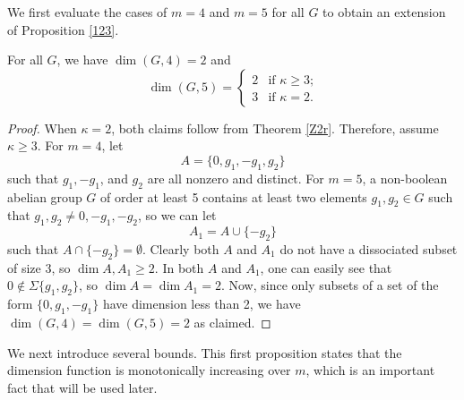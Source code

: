 \documentclass[ml]{sdoc}
\begin{document}
We first evaluate the cases of $m=4$ and $m=5$ for all $G$ to obtain an extension of Proposition \ref{123}.

\begin{proposition}\label{45}
    For all $G$, we have $\dim(G,4)=2$ and
    \[\dim(G,5)=\begin{cases}
    2 & \text{if $\kappa\geq3$;}\\
    3 & \text{if $\kappa=2$.}
    \end{cases}\]
\end{proposition}
\begin{proof}
    When $\kappa=2$, both claims follow from Theorem \ref{Z2r}. Therefore, assume $\kappa\geq3$. 
    For $m=4$, let
    \[A = \{0, g_1, -g_1, g_2\}\]
    such that $g_1, -g_1$, and $g_2$ are all nonzero and distinct. For $m=5$, a non-boolean abelian group $G$ of order at least 5 contains at least two elements $g_1,g_2\in G$ such that $g_1,g_2\neq 0,-g_1,-g_2$, so we can let
    \[A_1= A\cup\{-g_2\}\]
    such that $A\cap\{-g_2\}=\emptyset$. Clearly both $A$ and $A_1$ do not have a dissociated subset of size 3, so $\dim A,A_1\geq 2$. In both $A$ and $A_1$, one can easily see that $0\notin\Sigma\{g_1,g_2\}$, so $\dim A =\dim A_1=2$. Now, since only subsets of a set of the form $\{0,g_1,-g_1\}$ have dimension less than 2, we have $\dim(G,4)=\dim(G,5)=2$ as claimed.
\end{proof}


We next introduce several bounds. This first proposition states that the dimension function is monotonically increasing over $m$, which is an important fact that will be used later.
\end{document}
